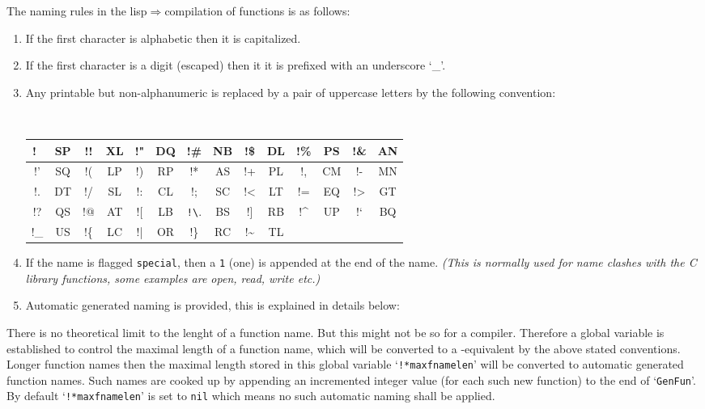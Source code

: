 The naming rules in the lisp$\Rightarrow$\C compilation of functions is as
follows:
\begin{enumerate}
\item
     If the first character is alphabetic then it  is capitalized.
\item
     If the first character is a digit (escaped) then it it is prefixed
     with an underscore `\_'.
\item
     Any printable but non-alphanumeric is replaced by a pair of
     uppercase letters by the following convention:

{\small\tt
     \begin{tabular}{|cc|cc|cc|cc|cc|cc|cc|}
     \hline
!\verb*. .& SP & !! & XL & !" & DQ &!\# & NB &!\$ & DL &!\% & PS &!\& & AN \\
     \hline
       !' & SQ & !( & LP & !) & RP & !* & AS & !+ & PL & !, & CM & !- & MN \\
     \hline
       !. & DT & !/ & SL & !: & CL & !; & SC & !< & LT & != & EQ & !> & GT \\
     \hline
       !? & QS & !@ & AT & ![ & LB &\verb.!\.&BS&!]& RB &!\^ & UP &!{\rm `}&BQ\\
     \hline
      !\_ & US &!\{ & LC & !| & OR &!\} & RC &!\~ & TL &
         \multicolumn{4}{|c}{} \\
      \cline{1-10}
     \end{tabular}
}
\item
     If the name is flagged {\tt special}, then a {\tt 1} (one) is appended
     at the end of the name. {\em (This is normally used for name clashes
     with the C library functions, some examples are open, read, write etc.)}
\item 	
     Automatic generated naming is provided, this is explained in details below:

\end{enumerate}

There is no theoretical limit to  the lenght of a function name.  But this might not be
so for a \C compiler. Therefore a global variable is established to control the maximal
length of a function name, which will be converted to a \CC-equivalent by the above stated 
conventions. Longer function names then the maximal length stored in this global variable 	
`{\tt !*maxfnamelen}' will be converted to automatic generated function names. Such names
are cooked up by appending an incremented integer value (for each such new function)
to the end of `{\tt GenFun}'.  By default `{\tt !*maxfnamelen}' is set to {\tt nil} which means 
no such automatic naming shall be applied. 

